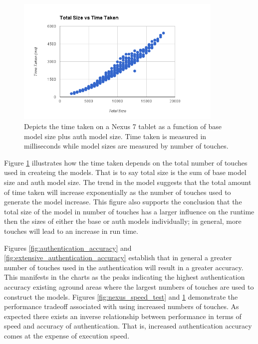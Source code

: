 \documentclass{acm_proc_article-sp}
\begin{document}
\begin{figure}
\centering
\includegraphics[width=3.9in]{nexus_total_size_time.png}
\caption{Depicts the time taken on a Nexus 7 tablet as a function of base model size plus auth model size. Time taken is measured in milliseconds while model sizes are measured by number of touches.}
\label{fig:nexus_total_size_time}
\end{figure}

Figure \ref{fig:nexus_total_size_time} illustrates how the time taken depends on the total number of touches used in createing the models. That is to say total size is the sum of base model size and auth model size. The trend in the model suggests that the total amount of time taken will increase exponentially as the number of touches used to generate the model increase.
This figure also supports the conclusion that the total size of the model in number of touches has a larger influence on the runtime then the sizes of either the base or auth models individually; in general, more touches will lead to an increase in run time.


Figures \ref{fig:authentication_accuracy} and \ref{fig:extensive_authentication_accuracy} establish that in general a greater number of touches used in the authentication will result in a greater accuracy. This manifests in the charts as the peaks indicating the highest authentication accuracy existing aground areas where the largest numbers of touches are used to construct the models. Figures \ref{fig:nexus_speed_test} and \ref{fig:nexus_total_size_time} demonstrate the performance tradeoff associated with using increased numbers of touches. 
As expected there exists an inverse relationship between performance in terms of speed and accuracy of authentication. That is, increased authentication accuracy comes at the expense of execution speed.
\end{document}
